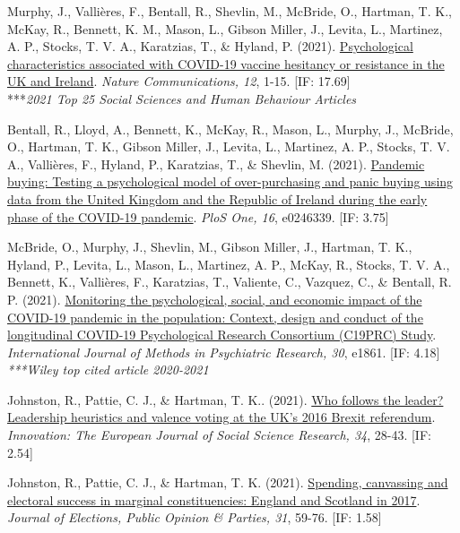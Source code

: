 \documentclass[12pt]{article}
\begin{document}
\begin{bibenum}
\item Murphy, J., Vallières, F., Bentall, R., 
	Shevlin, M.,  McBride, O., Hartman, T. K., 
	McKay, R., Bennett, K. M., Mason, L.,  
	Gibson Miller, J., Levita, L., Martinez, A. P., 
	Stocks, T. V. A.,  Karatzias, T., \& Hyland, P. 
	(2021).
	\href{https://doi.org/10.1038/s41467-020-20226-9}
	{Psychological characteristics associated with 
	COVID-19 vaccine hesitancy or resistance in 
	the UK and Ireland}. 
	\emph{Nature Communications, 12}, 1-15. 
	[IF: 17.69]\\
	\****\textit{2021 Top 25 Social Sciences 
	and Human Behaviour Articles}

\item Bentall, R., Lloyd, A., Bennett, K., 
	McKay, R., Mason, L., Murphy, J., 
	McBride, O., Hartman, T. K., Gibson Miller, J., 
	Levita, L., Martinez, A. P., Stocks, T. V. A., 
	Vallières, F., Hyland, P., Karatzias, T., 
	\& Shevlin, M. (2021). 
	\href{https://doi.org/10.1371/journal.pone.0246339}
	{Pandemic buying: Testing a psychological 
	model of over-purchasing and panic buying 
	using data from the United Kingdom and 
	the Republic of Ireland during the early 
	phase of the COVID-19 pandemic}.
	\emph{PloS One, 16}, e0246339. [IF: 3.75]
	
\item McBride, O., Murphy, J., Shevlin, M., 
	Gibson Miller, J., Hartman, T. K., Hyland, P., 
	Levita, L., Mason, L., Martinez, A. P., 
	McKay, R., Stocks, T. V. A., Bennett, K., 
	Vallières, F., Karatzias, T., Valiente, C., 
	Vazquez, C., \& Bentall, R. P. (2021). 
	\href{https://doi.org/10.1002/mpr.1861}
	{Monitoring the psychological, social, and 
	economic impact of the COVID-19 pandemic in 
	the population: Context, design and conduct 
	of the longitudinal COVID-19 Psychological 
	Research Consortium (C19PRC) Study}.
	\emph{International Journal of Methods in 
	Psychiatric Research, 30}, e1861. [IF: 4.18]\\
	\textit{***Wiley top cited article 2020-2021}
	
\item Johnston, R., Pattie, C. J., \& {Hartman, T. K.}. 
	(2021). 
	\href{https://doi.org/10.1080/13511610.2020.1746905}
	{Who follows the leader? Leadership heuristics 
	and valence voting at the UK’s 2016 Brexit referendum}. 
	\emph{Innovation: The European Journal of Social 
	Science Research, 34}, 28-43. [IF: 2.54]

\item Johnston, R., Pattie, C. J., \& Hartman, T. K. 
	(2021). 
	\href{https://doi.org/10.1080/17457289.2019.1582534}
	{Spending, canvassing and electoral success in 
	marginal constituencies: England and Scotland 
	in 2017}. \emph{Journal of Elections, Public 
	Opinion \& Parties, 31}, 59-76. [IF: 1.58]
		

\end{bibenum}
\end{document}
